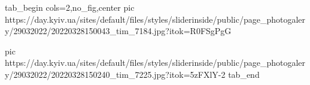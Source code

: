  
 
 
 
 

\ifcmt
  tab_begin cols=2,no_fig,center
     pic https://day.kyiv.ua/sites/default/files/styles/sliderinside/public/page_photogalery/29032022/20220328150043_tim_7184.jpg?itok=R0FSgPgG

		 pic https://day.kyiv.ua/sites/default/files/styles/sliderinside/public/page_photogalery/29032022/20220328150240_tim_7225.jpg?itok=5zFXlY-2
  tab_end
\fi
